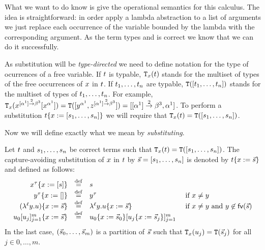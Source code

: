 What we want to do know is give the operational semantics for this calculus.
The idea is straightforward: in order apply a lambda abstraction to a list of arguments we just
replace each occurrence of the variable bounded by the lambda with the corresponding argument.
As the term types and is correct we know that we can do it successfully.

As substitution will be \emph{type-directed} we need to define notation for the type
of ocurrences of a free variable. If $t$ is typable,
$\mathtt{T}_{x}(t)$
stands for the multiset
of types of the free occurrences of $x$ in $t$.
If $t_1,\hdots,t_n$ are typable,
$\mathtt{T}([t_1,\hdots,t_n])$ stands for the multiset
of types of $t_1,\hdots,t_n$.
For example,
$\mathtt{T}_{x}(x^{[\alpha^1] \overset{2}{\to} \beta^3}[x^{\alpha^1}]) =
\mathtt{T}([y^{\alpha^1},z^{[\alpha^1] \overset{2}{\to} \beta^3}]) = [[\alpha^1] \overset{2}{\to} \beta^3,\alpha^1]$.
To perform a substitution $t\{x := [s_1,\hdots,s_n]\}$
we will require that $\mathtt{T}_{x}(t) = \mathtt{T}([s_1,\hdots,s_n])$.


Now we will define exactly what we mean by \emph{substituting}.
\begin{definition}[Substitution]
Let $t$ and $s_1,\hdots,s_n$ be correct terms such that $\mathtt{T}_{x}(t) = \mathtt{T}([s_1,\hdots,s_n])$.
The capture-avoiding substitution of $x$ in $t$ by $\vec{s} = [s_1,\hdots,s_n]$
is denoted by $t\{x := \vec{s}\}$ and defined as follows:
\[
  \begin{array}{rcll}
    x^\tau\{x := [s]\} & \overset{\mathrm{def}}{=} & s
  \\
    y^\tau\{x := []\} & \overset{\mathrm{def}}{=} & y^\tau
    & \text{ if $x \neq y$}
  \\
    (\lambda^{\ell} y. u)\{x := \vec{s}\} & \overset{\mathrm{def}}{=} &  \lambda^{\ell} y.  u\{x := \vec{s}\}
    & \text{ if $x \neq y$ and $y \not\in \mathsf{fv}({\vec{s}})$}
  \\
    u_0[u_j]_{j=1}^{m}\{x := \vec{s}\} & \overset{\mathrm{def}}{=} &
    u_0\{x := \vec{s}_0\}[u_j\{x := \vec{s}_j\}]_{j=1}^{m}
  \end{array}
\]
In the last case, $(\vec{s}_0, \hdots, \vec{s}_m)$
is a partition of $\vec{s}$
such that $\mathtt{T}_{x}(u_j) = \mathtt{T}(\vec{s}_j)$ for all $j \in {0,\hdots,m}$.
\end{definition}

